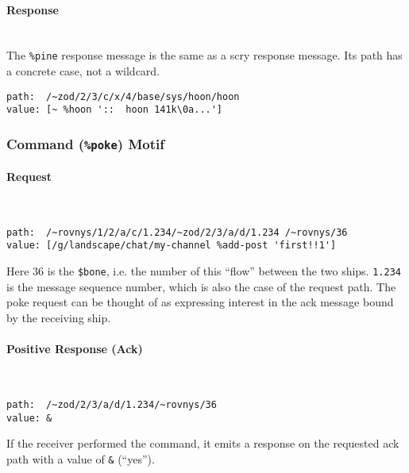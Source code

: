 \documentclass[twoside]{article}
\begin{document}
\paragraph{Response} \mbox{}\\

The \lstinline[style=inlinecode]{%pine} response message is the same as a scry response message. Its path has a concrete case, not a wildcard.

\begin{lstlisting}[style=listingcode]
path:  /~zod/2/3/c/x/4/base/sys/hoon/hoon
value: [~ %hoon '::  hoon 141k\0a...']
\end{lstlisting}

\subsubsection{Command (\texttt{\%poke}) Motif}

\paragraph{Request} \mbox{}\\

\begin{lstlisting}[style=listingcode]
path:  /~rovnys/1/2/a/c/1.234/~zod/2/3/a/d/1.234 /~rovnys/36
value: [/g/landscape/chat/my-channel %add-post 'first!!1']
\end{lstlisting}

Here 36 is the \lstinline[style=inlinecode]{$bone}, i.e. the number of this ``flow'' between the two ships. \lstinline[style=inlinecode]{1.234} is the message sequence number, which is also the case of the request path. The poke request can be thought of as expressing interest in the ack message bound by the receiving ship.

\paragraph{Positive Response (Ack)} \mbox{}\\

\begin{lstlisting}[style=listingcode]
path:  /~zod/2/3/a/d/1.234/~rovnys/36
value: &
\end{lstlisting}

If the receiver performed the command, it emits a response on the requested ack path with a value of \lstinline[style=inlinecode]{&} (``yes'').

\pagebreak{}
\end{document}
